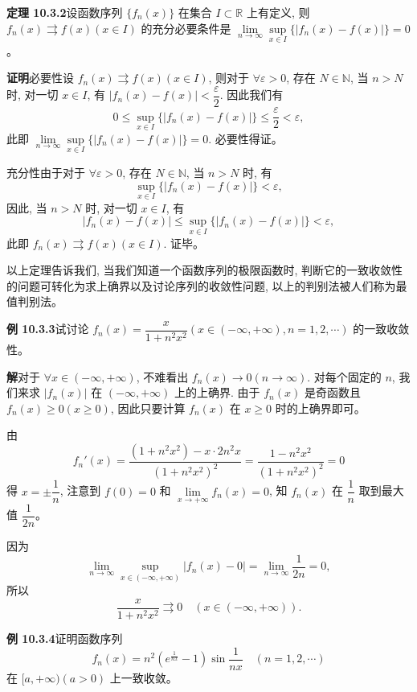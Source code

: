 \documentclass[UTF8, 12pt, fontset=fandol, oneside]{ctexart}
\begin{document}
\noindent\textbf{定理 10.3.2}\quad 设函数序列 $\{f_n(x)\}$ 在集合 $I\subset\mathbb R$ 上有定义, 则 $f_n(x)\rightrightarrows f(x)(x\in I)$ 的充分必要条件是 $\lim\limits_{n\to\infty}\sup\limits_{x\in I}\{|f_n(x)-f(x)|\}=0$。

\noindent\textbf{证明}\quad 必要性\quad 设 $f_n(x)\rightrightarrows f(x)(x\in I)$, 则对于 $\forall\varepsilon>0$, 存在 $N\in\mathbb N$, 当 $n>N$ 时, 对一切 $x\in I$, 有 $|f_n(x)-f(x)|<\dfrac\varepsilon2$. 因此我们有
\[
  0\leq \sup_{x\in I}\{|f_n(x)-f(x)|\}\leq\frac\varepsilon2<\varepsilon,
\]
此即 $\lim\limits_{n\to\infty}\sup\limits_{x\in I}\{|f_n(x)-f(x)|\}=0$. 必要性得证。

充分性\quad 由于对于 $\forall\varepsilon>0$, 存在 $N\in\mathbb N$, 当 $n>N$ 时, 有
\[
  \sup_{x\in I}\{|f_n(x)-f(x)|\}<\varepsilon,
\]
因此, 当 $n>N$ 时, 对一切 $x\in I$, 有
\[
  |f_n(x)-f(x)|\leq \sup_{x\in I}\{|f_n(x)-f(x)|\}<\varepsilon,
\]
此即 $f_n(x)\rightrightarrows f(x)(x\in I)$. 证毕。

以上定理告诉我们, 当我们知道一个函数序列的极限函数时, 判断它的一致收敛性的问题可转化为求上确界以及讨论序列的收敛性问题, 以上的判别法被人们称为最值判别法。

\noindent\textbf{例 10.3.3}\quad 试讨论 $f_n(x)=\dfrac{x}{1+n^2x^2}(x\in(-\infty,+\infty), n=1,2,\cdots)$ 的一致收敛性。

\noindent\textbf{解}\quad 对于 $\forall x\in(-\infty,+\infty)$, 不难看出 $f_n(x)\to0(n\to\infty)$. 对每个固定的 $n$, 我们来求 $|f_n(x)|$ 在 $(-\infty,+\infty)$ 上的上确界. 由于 $f_n(x)$ 是奇函数且 $f_n(x)\geq0(x\geq0)$, 因此只要计算 $f_n(x)$ 在 $x\geq0$ 时的上确界即可。

由
\[
  f_n'(x)=\frac{(1+n^2x^2)-x\cdot2n^2x}{(1+n^2x^2)^2}
  =\frac{1-n^2x^2}{(1+n^2x^2)^2}=0
\]
得 $x=\pm\dfrac1n$, 注意到 $f(0)=0$ 和 $\lim\limits_{x\to+\infty}f_n(x)=0$, 知 $f_n(x)$ 在 $\dfrac1n$ 取到最大值 $\dfrac1{2n}$。

因为
\[
  \lim_{n\to\infty}\sup_{x\in(-\infty,+\infty)}|f_n(x)-0|
  =\lim_{n\to\infty}\frac1{2n}=0,
\]
所以
\[
  \frac{x}{1+n^2x^2}\rightrightarrows0\quad(x\in(-\infty,+\infty)).
\]

\noindent\textbf{例 10.3.4}\quad 证明函数序列
\[
  f_n(x)=n^2\left(e^{\frac1{nx}}-1\right)\sin\frac1{nx}\quad(n=1,2,\cdots)
\]
在 $[a,+\infty)(a>0)$ 上一致收敛。
\end{document}
